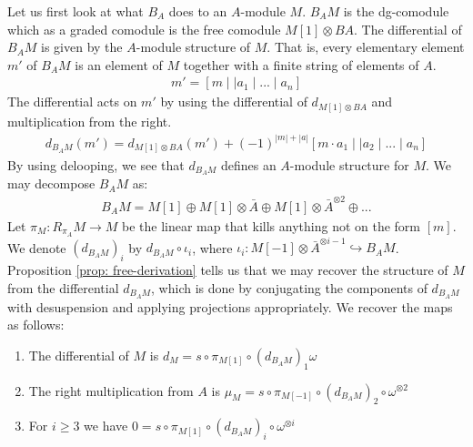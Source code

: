 \documentclass[../thesis.tex]{subfiles}
\begin{document}
            Let us first look at what $B_A$ does to an $A$-module $M$. $B_AM$ is the dg-comodule which as a graded comodule is the free comodule $M[1] \otimes BA$. The differential of $B_AM$ is given by the $A$-module structure of $M$. That is, every elementary element $m'$ of $B_AM$ is an element of $M$ together with a finite string of elements of $A$.
            \begin{align*}
                m' = [ m \mid\mid a_1 \mid ... \mid a_n]
            \end{align*}
            The differential acts on $m'$ by using the differential of $d_{M[1]\otimes BA}$ and multiplication from the right.
            \begin{align*}
                d_{B_AM}(m') = d_{M[1]\otimes BA}(m') + (-1)^{|m|+|a|} [m\cdot a_1 \mid\mid a_2 \mid ... \mid a_n]
            \end{align*}
            By using delooping, we see that $d_{B_AM}$ defines an $A$-module structure for $M$. We may decompose $B_AM$ as:
            \begin{align*}
                B_AM = M[1] \oplus M[1] \otimes \bar{A} \oplus M[1] \otimes \bar{A}^{\otimes 2} \oplus ...
            \end{align*}
            Let $\pi_M: R_{\pi_A}M \rightarrow M$ be the linear map that kills anything not on the form $[m]$. We denote $(d_{B_AM})_i$ by $d_{B_AM} \circ \iota_i$, where $\iota_i : M[-1] \otimes \bar{A}^{\otimes i-1} \hookrightarrow B_AM$. Proposition \ref{prop: free-derivation} tells us that we may recover the structure of $M$ from the differential $d_{B_AM}$, which is done by conjugating the components of $d_{B_AM}$ with desuspension and applying projections appropriately. We recover the maps as follows:
            \begin{enumerate}
                \item The differential of $M$ is $d_M = s \circ \pi_{M[1]} \circ (d_{B_AM})_1 \omega$
                \item The right multiplication from $A$ is $\mu_M = s\circ \pi_{M[-1]} \circ (d_{B_AM})_2 \circ \omega^{\otimes 2}$
                \item For $i \geq 3$ we have $0 = s \circ \pi_{M[1]} \circ (d_{B_AM})_i \circ \omega^{\otimes i}$
            \end{enumerate}
\end{document}
